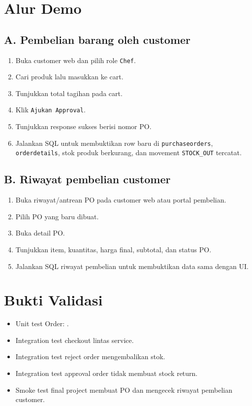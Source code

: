 \documentclass[11pt,a4paper]{article}
\begin{document}
\section*{Alur Demo}
\subsection*{A. Pembelian barang oleh customer}
\begin{enumerate}
\item Buka customer web dan pilih role \texttt{Chef}.
\item Cari produk lalu masukkan ke cart.
\item Tunjukkan total tagihan pada cart.
\item Klik \texttt{Ajukan Approval}.
\item Tunjukkan response sukses berisi nomor PO.
\item Jalankan SQL untuk membuktikan row baru di \texttt{purchaseorders}, \texttt{orderdetails}, stok produk berkurang, dan movement \texttt{STOCK\_OUT} tercatat.
\end{enumerate}

\subsection*{B. Riwayat pembelian customer}
\begin{enumerate}
\item Buka riwayat/antrean PO pada customer web atau portal pembelian.
\item Pilih PO yang baru dibuat.
\item Buka detail PO.
\item Tunjukkan item, kuantitas, harga final, subtotal, dan status PO.
\item Jalankan SQL riwayat pembelian untuk membuktikan data sama dengan UI.
\end{enumerate}

\section*{Bukti Validasi}
\begin{itemize}
\item Unit test Order: .
\item Integration test checkout lintas service.
\item Integration test reject order mengembalikan stok.
\item Integration test approval order tidak membuat stock return.
\item Smoke test final project membuat PO dan mengecek riwayat pembelian customer.
\end{itemize}
\end{document}
